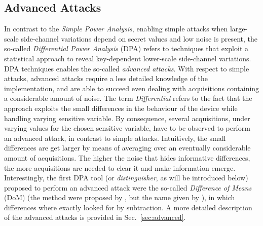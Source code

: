 \subsection{Advanced Attacks}
In contrast to the \emph{Simple Power Analysis}, enabling simple attacks when large-scale side-channel variations depend on secret values and low noise is present, the so-called \emph{Differential Power Analysis} (DPA) refers to techniques that exploit  a statistical approach to reveal key-dependent lower-scale side-channel variations. DPA techniques enables the so-called \emph{advanced attacks}. With respect to simple attacks, advanced attacks  require a less detailed knowledge of the implementation, and are able to succeed even dealing with acquisitions containing a considerable amount of noise. The term \emph{Differential} refers to the fact that the approach exploits the small differences in the behaviour of the device while handling varying sensitive variable. By consequence,  several acquisitions, under varying values for the chosen sensitive variable, have to be observed to perform an advanced attack, in contrast to simple attacks. Intuitively, the small differences are get larger by means of averaging over an eventually considerable amount of acquisitions. The higher the noise that hides informative differences, the more acquisitions are needed to clear it and make information emerge. Interestingly, the first DPA tool (or \emph{distinguisher}, as will be introduced below) proposed to perform an advanced attack were the so-called \emph{Difference of Means} (DoM) (the method were proposed by \cite{kocher1999differential}, but the name given by \cite{Chari2003}),  in which differences where exactly looked for by subtraction. A more detailed description of the advanced attacks is provided in Sec.~\ref{sec:advanced}.\\



